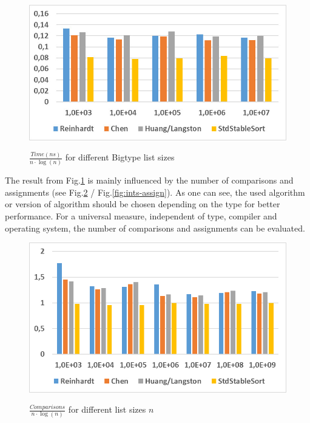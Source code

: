 \documentclass[11pt,pdftex,a4paper, twocolumn]{article}
\begin{document}
\begin{figure}[H]
\includegraphics[width=\linewidth]{Diagramm-Bilder/big-beidesTeuer.JPG} \\
\caption{ $ \frac{Time(ns)}{n \cdot \log(n)} $ for different Bigtype list sizes } \label{fig:big-beides-Teuer}
\end{figure}
The result from Fig.\ref{fig:big-beides-Teuer} is mainly influenced by the number of comparisons and assignments (see Fig.\ref{fig:ints-comp} / Fig.\ref{fig:ints-assign}). As one can see, the used algorithm or version of algorithm should be chosen depending on the type for better performance. For a universal measure, independent of type, compiler and operating system, the number of comparisons and assignments can be evaluated. \\
\begin{figure}[H]
\includegraphics[width=\linewidth]{Diagramm-Bilder/ints-comparisons.JPG} \\
\caption{ $ \frac{Comparisons}{n \cdot \log(n)} $ for different list sizes $ n $ } \label{fig:ints-comp}
\end{figure}
\end{document}
